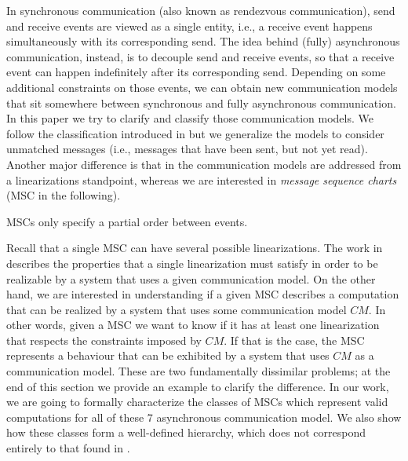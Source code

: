 


In synchronous communication (also known as rendezvous communication), send and receive events are  viewed as a single entity, i.e., a receive event  happens simultaneously with its corresponding send. The  idea behind (fully) asynchronous communication, instead, is to decouple send and receive events, so that a receive event can happen indefinitely after its corresponding send. Depending on some additional constraints on those events, we can obtain new communication models that sit somewhere between synchronous and fully asynchronous communication.
In this paper we try to clarify and classify those communication models. We follow the classification introduced in \cite{DBLP:journals/fac/ChevrouHQ16} but we generalize the models to  consider unmatched messages (i.e., messages that have been sent, but not yet read). Another major difference is that in \cite{DBLP:journals/fac/ChevrouHQ16} the communication models are addressed from a linearizations standpoint, whereas we are interested in \emph{message sequence charts} (MSC in the following).

MSCs only specify a partial order between events.


Recall that a single MSC can have several possible linearizations. The work in \cite{DBLP:journals/fac/ChevrouHQ16} describes the properties that a single linearization must satisfy in order to be realizable by a system that uses a given communication model. On the other hand, we are interested in understanding if a given MSC describes a computation that can be realized by a system that uses some communication model $CM$. In other words, given a MSC we want to know if it has at least one linearization that respects the constraints imposed by $CM$. If that is the case, the MSC represents a behaviour that can be exhibited by a system that uses $CM$ as a communication model. These are two fundamentally dissimilar problems; at the end of this section we provide an example to clarify the difference. In our work, we are going to formally characterize the classes of MSCs which represent valid computations for all of these 7 asynchronous communication model. We also show how these classes form a well-defined hierarchy, which does not correspond entirely to that found in \cite{DBLP:journals/fac/ChevrouHQ16}.


